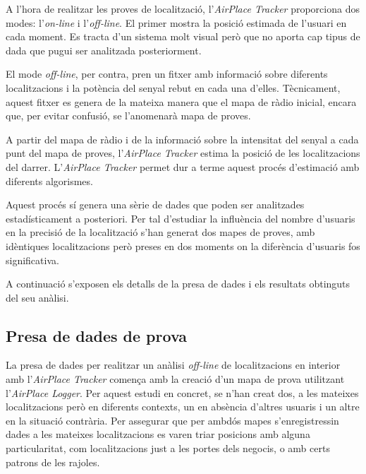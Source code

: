
A l'hora de realitzar les proves de localització, l'\textit{AirPlace Tracker} proporciona dos modes: l'\textit{on-line} i l'\textit{off-line}. El primer mostra la posició estimada de l'usuari en cada moment. Es tracta d'un sistema molt visual però que no aporta cap tipus de dada que pugui ser analitzada posteriorment.

El mode \textit{off-line}, per contra, pren un fitxer amb informació sobre diferents localitzacions i la potència del senyal rebut en cada una d'elles. Tècnicament, aquest fitxer es genera de la mateixa manera que el mapa de ràdio inicial, encara que, per evitar confusió, se l'anomenarà mapa de proves.

A partir del mapa de ràdio i de la informació sobre la intensitat del senyal a cada punt del mapa de proves, l'\textit{AirPlace Tracker} estima la posició de les localitzacions del darrer. L'\textit{AirPlace Tracker} permet dur a terme aquest procés d'estimació amb diferents algorismes.

Aquest procés sí genera una sèrie de dades que poden ser analitzades estadísticament a posteriori. Per tal d'estudiar la influència del nombre d'usuaris en la precisió de la localització s'han generat dos mapes de proves, amb idèntiques localitzacions però preses en dos moments on la diferència d'usuaris fos significativa.

A continuació s'exposen els detalls de la presa de dades i els resultats obtinguts del seu anàlisi.

\subsection{Presa de dades de prova}

La presa de dades per realitzar un anàlisi \textit{off-line} de localitzacions en interior amb l'\textit{AirPlace Tracker} comença amb la creació d'un mapa de prova utilitzant l'\textit{AirPlace Logger}. Per aquest estudi en concret, se n'han creat dos, a les mateixes localitzacions però en diferents contexts, un en absència d'altres usuaris i un altre en la situació contrària. Per assegurar que per ambdós mapes s'enregistressin dades a les mateixes localitzacions es varen triar posicions amb alguna particularitat, com localitzacions just a les portes dels negocis, o amb certs patrons de les rajoles.

